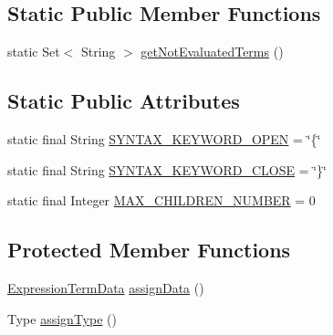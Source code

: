\subsection*{Static Public Member Functions}
\begin{DoxyCompactItemize}
\item 
static Set$<$ String $>$ \hyperlink{classit_1_1emarolab_1_1cagg_1_1core_1_1language_1_1syntax_1_1expressionTree_1_1expressionNodeType_1_1TermExpressionNode_a1c72a090a6091cdefd7103a6ed853d87}{get\-Not\-Evaluated\-Terms} ()
\end{DoxyCompactItemize}
\subsection*{Static Public Attributes}
\begin{DoxyCompactItemize}
\item 
static final String \hyperlink{classit_1_1emarolab_1_1cagg_1_1core_1_1language_1_1syntax_1_1expressionTree_1_1expressionNodeType_1_1TermExpressionNode_a7f29fac5dde533669194682488715dc8}{S\-Y\-N\-T\-A\-X\-\_\-\-K\-E\-Y\-W\-O\-R\-D\-\_\-\-O\-P\-E\-N} = \char`\"{}\{\char`\"{}
\item 
static final String \hyperlink{classit_1_1emarolab_1_1cagg_1_1core_1_1language_1_1syntax_1_1expressionTree_1_1expressionNodeType_1_1TermExpressionNode_a42d7a1f04d1fe55e8f1811fdb9884ed0}{S\-Y\-N\-T\-A\-X\-\_\-\-K\-E\-Y\-W\-O\-R\-D\-\_\-\-C\-L\-O\-S\-E} = \char`\"{}\}\char`\"{}
\item 
static final Integer \hyperlink{classit_1_1emarolab_1_1cagg_1_1core_1_1language_1_1syntax_1_1expressionTree_1_1expressionNodeType_1_1TermExpressionNode_ac73351a86d66c9209a1c2a732a3fbca5}{M\-A\-X\-\_\-\-C\-H\-I\-L\-D\-R\-E\-N\-\_\-\-N\-U\-M\-B\-E\-R} = 0
\end{DoxyCompactItemize}
\subsection*{Protected Member Functions}
\begin{DoxyCompactItemize}
\item 
\hyperlink{classit_1_1emarolab_1_1cagg_1_1core_1_1language_1_1syntax_1_1expressionTree_1_1ExpressionDataFactory_1_1ExpressionTermData}{Expression\-Term\-Data} \hyperlink{classit_1_1emarolab_1_1cagg_1_1core_1_1language_1_1syntax_1_1expressionTree_1_1expressionNodeType_1_1TermExpressionNode_a22dccf0f442183a5b1ce02341c9aa67c}{assign\-Data} ()
\item 
Type \hyperlink{classit_1_1emarolab_1_1cagg_1_1core_1_1language_1_1syntax_1_1expressionTree_1_1expressionNodeType_1_1TermExpressionNode_addd250aca849d09894ea5f26a6fc4baf}{assign\-Type} ()
\end{DoxyCompactItemize}
